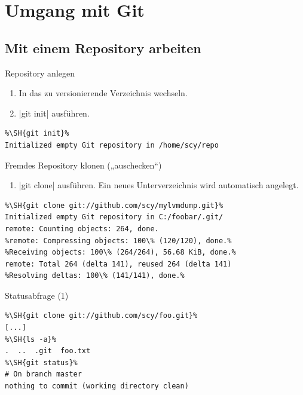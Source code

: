 \section{Umgang mit Git}

\subsection{Mit einem Repository arbeiten}

\begin{frame}[fragile=singleslide]{Repository anlegen}
\begin{enumerate}
	\item In das zu versionierende Verzeichnis wechseln.
	\item \TYPE|git init| ausführen.
\end{enumerate}
\begin{example}
\begin{lstlisting}
%\SH{git init}%
Initialized empty Git repository in /home/scy/repo
\end{lstlisting}
\end{example}
\end{frame}

\begin{frame}[fragile=singleslide]{Fremdes Repository klonen („auschecken“)}
\begin{enumerate}
	\item \TYPE|git clone| ausführen. Ein neues Unterverzeichnis wird automatisch angelegt.
\end{enumerate}
\begin{example}
\begin{lstlisting}
%\SH{git clone git://github.com/scy/mylvmdump.git}%
Initialized empty Git repository in C:/foobar/.git/
remote: Counting objects: 264, done.
%remote: Compressing objects: 100\% (120/120), done.%
%Receiving objects: 100\% (264/264), 56.68 KiB, done.%
remote: Total 264 (delta 141), reused 264 (delta 141)
%Resolving deltas: 100\% (141/141), done.%
\end{lstlisting}
\end{example}
\end{frame}

\begin{frame}[fragile=singleslide]{Statusabfrage (1)}
\begin{example}
\begin{lstlisting}
%\SH{git clone git://github.com/scy/foo.git}%
[...]
%\SH{ls -a}%
.  ..  .git  foo.txt
%\SH{git status}%
# On branch master
nothing to commit (working directory clean)
\end{lstlisting}
\end{example}
\end{frame}

